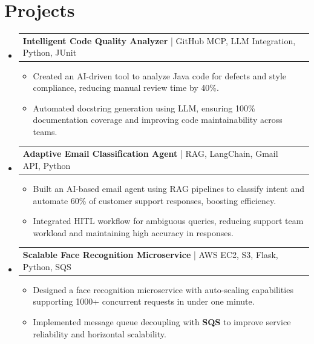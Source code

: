 \documentclass[letterpaper,11pt]{article}
\makeatletter
\newcommand{\resumeItem}[1]{
  \item\footnotesize{
    {#1 \vspace{-2pt}}
  }
}
\newcommand{\resumeProjectHeading}[2]{
    \item
    \begin{tabular*}{1.001\textwidth}{l@{\extracolsep{\fill}}r}
      \small#1 & \textbf{\small #2}\\
    \end{tabular*}\vspace{-7pt}
}
\newcommand{\resumeSubHeadingListStart}{\begin{itemize}[leftmargin=0pt, label={}]}
\newcommand{\resumeSubHeadingListEnd}{\end{itemize}}
\newcommand{\resumeItemListStart}{\begin{itemize}[leftmargin=*]}
\newcommand{\resumeItemListEnd}{\end{itemize}\vspace{-5pt}}
\makeatother
\begin{document}
\section{Projects}
    \vspace{-5pt}
    \resumeSubHeadingListStart
          \resumeProjectHeading
              {\textbf{Intelligent Code Quality Analyzer} | GitHub MCP, LLM Integration, Python, JUnit}{}
        \resumeItemListStart
            \resumeItem{Created an AI-driven tool to analyze Java code for defects and style compliance, reducing manual review time by 40\%.}
            \resumeItem{Automated docstring generation using LLM, ensuring 100\% documentation coverage and improving code maintainability across teams.}
        \resumeItemListEnd
        \vspace{-12pt}
    
    \resumeProjectHeading
        {\textbf{Adaptive Email Classification Agent} | RAG, LangChain, Gmail API, Python}{}
        \resumeItemListStart
            \resumeItem{Built an AI-based email agent using RAG pipelines to classify intent and automate 60\% of customer support responses, boosting efficiency.}
            \resumeItem{Integrated HITL workflow for ambiguous queries, reducing support team workload and maintaining high accuracy in responses.}
        \resumeItemListEnd
          \vspace{-12pt}
      \resumeProjectHeading
          {\textbf{Scalable Face Recognition Microservice} | AWS EC2, S3, Flask, Python, SQS}{}
          \resumeItemListStart
              \resumeItem{Designed a face recognition microservice with auto-scaling capabilities supporting 1000+ concurrent requests in under one minute.}
              \resumeItem{Implemented message queue decoupling with \textbf{SQS} to improve service reliability and horizontal scalability.}
          \resumeItemListEnd 
    \resumeSubHeadingListEnd
\end{document}

